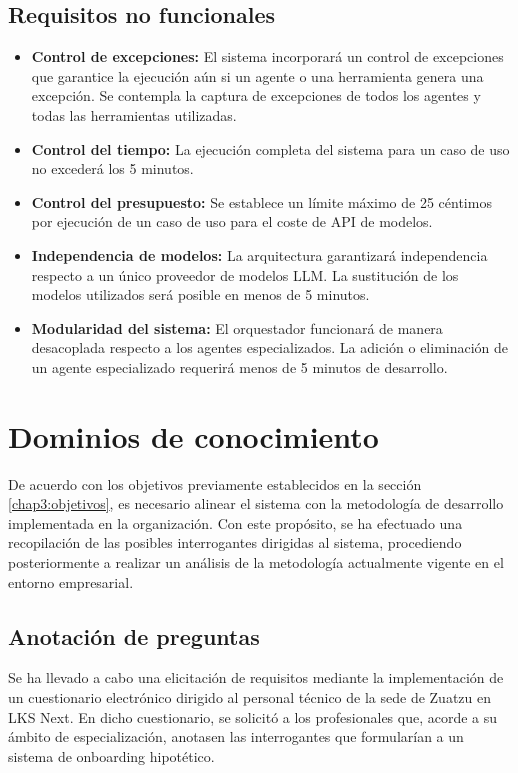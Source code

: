 \subsection{Requisitos no funcionales}
\begin{itemize}
\item\textbf{Control de excepciones: }El sistema incorporará un control de excepciones que garantice la ejecución aún si un agente o una herramienta genera una excepción. Se contempla la captura de excepciones de todos los agentes y todas las herramientas utilizadas.
\item\textbf{Control del tiempo: }La ejecución completa del sistema para un caso de uso no excederá los 5 minutos.
\item\textbf{Control del presupuesto: }Se establece un límite máximo de 25 céntimos por ejecución de un caso de uso para el coste de API de modelos.
\item\textbf{Independencia de modelos: }La arquitectura garantizará independencia respecto a un único proveedor de modelos LLM. La sustitución de los modelos utilizados será posible en menos de 5 minutos.
\item\textbf{Modularidad del sistema: }El orquestador funcionará de manera desacoplada respecto a los agentes especializados. La adición o eliminación de un agente especializado requerirá menos de 5 minutos de desarrollo.
\end{itemize}

\section{Dominios de conocimiento}
De acuerdo con los objetivos previamente establecidos en la sección \ref{chap3:objetivos}, es necesario alinear el sistema con la metodología de desarrollo implementada en la organización. Con este propósito, se ha efectuado una recopilación de las posibles interrogantes dirigidas al sistema, procediendo posteriormente a realizar un análisis de la metodología actualmente vigente en el entorno empresarial.

\subsection{Anotación de preguntas}
Se ha llevado a cabo una elicitación de requisitos mediante la implementación de un cuestionario electrónico dirigido al personal técnico de la sede de Zuatzu en LKS Next. En dicho cuestionario, se solicitó a los profesionales que, acorde a su ámbito de especialización, anotasen las interrogantes que formularían a un sistema de onboarding hipotético.

